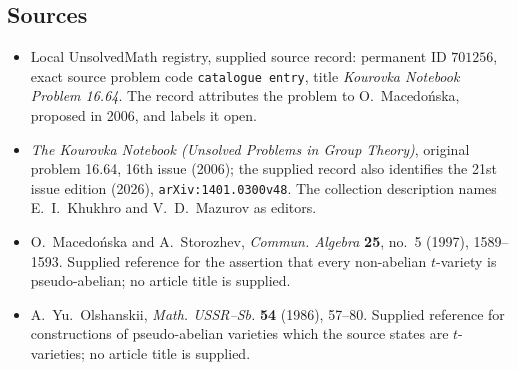 \documentclass[11pt]{article}
\begin{document}
\subsection{Sources}
\begin{itemize}
\item Local UnsolvedMath registry, supplied source record: permanent ID \(701256\), exact source problem code \texttt{catalogue entry}, title \emph{Kourovka Notebook Problem 16.64}. The record attributes the problem to O.~Macedo\'{n}ska, proposed in 2006, and labels it open.
\item \emph{The Kourovka Notebook (Unsolved Problems in Group Theory)}, original problem 16.64, 16th issue (2006); the supplied record also identifies the 21st issue edition (2026), \texttt{arXiv:1401.0300v48}. The collection description names E.~I.~Khukhro and V.~D.~Mazurov as editors.
\item O.~Macedo\'{n}ska and A.~Storozhev, \emph{Commun. Algebra} \textbf{25}, no.~5 (1997), 1589--1593. Supplied reference for the assertion that every non-abelian \(t\)-variety is pseudo-abelian; no article title is supplied.
\item A.~Yu.~Olshanskii, \emph{Math. USSR--Sb.} \textbf{54} (1986), 57--80. Supplied reference for constructions of pseudo-abelian varieties which the source states are \(t\)-varieties; no article title is supplied.
\end{itemize}
\end{document}
